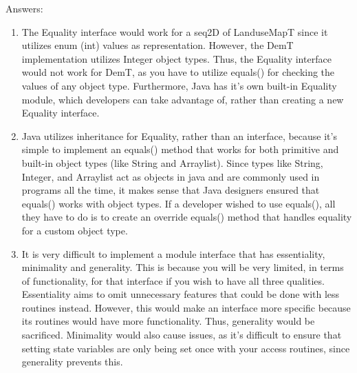 \documentclass[12pt]{article}
\begin{document}
Answers: 
\begin{enumerate}
\item 
The Equality interface would work for a seq2D of LanduseMapT since it utilizes enum (int) values as representation. However, the DemT implementation utilizes Integer object types. Thus, the Equality interface would not work for DemT, as you have to utilize equals() for checking the values of any object type. Furthermore, Java has it's own built-in Equality module, which developers can take advantage of, rather than creating a new Equality interface.

\item 
Java utilizes inheritance for Equality, rather than an interface, because it's simple to implement an equals() method that works for both primitive and built-in object types (like String and Arraylist).
Since types like String, Integer, and Arraylist act as objects in java and are commonly used in programs all the time, it makes sense that Java designers ensured that equals() works with object types. If a developer wished to use equals(), all they have to do is to create an override equals() method that handles equality for a custom object type.

\item 
It is very difficult to implement a module interface that has essentiality, minimality and generality. This is because you will be very limited, in terms of functionality, for that interface if you wish to have all three qualities. Essentiality aims to omit unnecessary features that could be done with less routines instead. However, this would make an interface more specific because its routines would have more functionality. Thus, generality would be sacrificed. Minimality would also cause issues, as it's difficult to ensure that setting state variables are only being set once with your access routines, since generality prevents this.

\end{enumerate}
\end{document}
